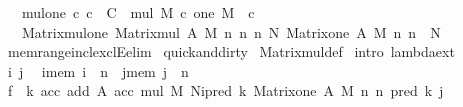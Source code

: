\begin{isabellebody}
\ \ \ mul{\isacharunderscore}{\kern0pt}one{\isacharcolon}{\kern0pt}\ {\isachardoublequoteopen}{\isasymAnd}c{\isachardot}{\kern0pt}\ c\ {\isacharcolon}{\kern0pt}\ C\ {\isasymLongrightarrow}\ mul\ M\ c\ {\isacharparenleft}{\kern0pt}one\ M{\isacharparenright}{\kern0pt}\ {\isacharequal}{\kern0pt}\ c{\isachardoublequoteclose}\isanewline
\ \ \ Matrix{\isacharunderscore}{\kern0pt}mul{\isacharunderscore}{\kern0pt}one{\isacharcolon}{\kern0pt}\ {\isachardoublequoteopen}Matrix{\isacharunderscore}{\kern0pt}mul\ A\ M\ n\ n\ n\ N\ {\isacharparenleft}{\kern0pt}Matrix{\isacharunderscore}{\kern0pt}one\ A\ M\ n\ n{\isacharparenright}{\kern0pt}\ {\isacharequal}{\kern0pt}\ N{\isachardoublequoteclose}\isanewline
%
\isadelimproof
%
\endisadelimproof
%
\isatagproof
{}\isamarkupfalse%
\ mem{\isacharunderscore}{\kern0pt}range{\isacharunderscore}{\kern0pt}incl{\isacharunderscore}{\kern0pt}exclE{\isacharbrackleft}{\kern0pt}elim{\isacharbrackright}{\kern0pt}\isanewline
\ {\isacharbrackleft}{\kern0pt}{\isacharbrackleft}{\kern0pt}quick{\isacharunderscore}{\kern0pt}and{\isacharunderscore}{\kern0pt}dirty{\isacharbrackright}{\kern0pt}{\isacharbrackright}{\kern0pt}\isanewline
{}\isamarkupfalse%
\ Matrix{\isacharunderscore}{\kern0pt}mul{\isacharunderscore}{\kern0pt}def\isanewline
{}\isamarkupfalse%
\ {\isacharparenleft}{\kern0pt}intro\ lambda{\isacharunderscore}{\kern0pt}ext{\isacharparenright}{\kern0pt}\isanewline
\ \ \isamarkupfalse%
\ i\ j\ \isamarkupfalse%
\ i{\isacharunderscore}{\kern0pt}mem{\isacharcolon}{\kern0pt}\ {\isachardoublequoteopen}i\ {\isasymin}\ {\isacharbrackleft}{\kern0pt}{}{\isacharcomma}{\kern0pt}{\isasymdots}{\isacharcomma}{\kern0pt}n{\isacharbrackleft}{\kern0pt}{\isachardoublequoteclose}\ \ j{\isacharunderscore}{\kern0pt}mem{\isacharcolon}{\kern0pt}\ {\isachardoublequoteopen}j\ {\isasymin}\ {\isacharbrackleft}{\kern0pt}{}{\isacharcomma}{\kern0pt}{\isasymdots}{\isacharcomma}{\kern0pt}n{\isacharbrackleft}{\kern0pt}{\isachardoublequoteclose}\isanewline
\ \ \isamarkupfalse%
\ {\isacharquery}{\kern0pt}f\ {\isacharequal}{\kern0pt}\ {\isachardoublequoteopen}{\isasymlambda}k\ acc{\isachardot}{\kern0pt}\ add\ A\ acc\ {\isacharparenleft}{\kern0pt}mul\ M\ {\isacharparenleft}{\kern0pt}N{\isacharbackquote}{\kern0pt}i{\isacharbackquote}{\kern0pt}{\isacharparenleft}{\kern0pt}pred\ k{\isacharparenright}{\kern0pt}{\isacharparenright}{\kern0pt}\ {\isacharparenleft}{\kern0pt}Matrix{\isacharunderscore}{\kern0pt}one\ A\ M\ n\ n\ {\isacharbackquote}{\kern0pt}{\isacharparenleft}{\kern0pt}pred\ k{\isacharparenright}{\kern0pt}\ {\isacharbackquote}{\kern0pt}j{\isacharparenright}{\kern0pt}{\isacharparenright}{\kern0pt}{\isachardoublequoteclose}\isanewline

\end{isabellebody}
